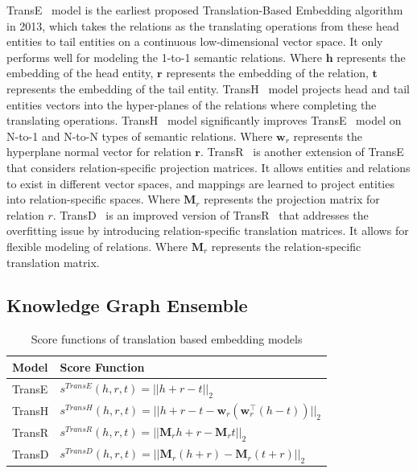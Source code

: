 \documentclass{article}
\begin{document}
TransE~\cite{bordes2013translating} model is the earliest proposed Translation-Based Embedding algorithm in 2013, which takes the relations as the translating operations from these head entities to tail entities on a continuous low-dimensional vector space. It only performs well for modeling the 1-to-1 semantic relations. Where \(\textbf{h}\) represents the embedding of the head entity, \(\textbf{r}\) represents the embedding of the relation, \(\textbf{t}\) represents the embedding of the tail entity. TransH~\cite{wang2014knowledge} model projects head and tail entities vectors into the hyper-planes of the relations where completing the translating operations. TransH~\cite{wang2014knowledge} model significantly improves TransE~\cite{bordes2013translating} model on N-to-1 and N-to-N types of semantic relations. Where \(\textbf{w}_r\) represents the hyperplane normal vector for relation \(\textbf{r}\). TransR~\cite{lin2015learning} is another extension of TransE~\cite{bordes2013translating} that considers relation-specific projection matrices. It allows entities and relations to exist in different vector spaces, and mappings are learned to project entities into relation-specific spaces. Where \(\textbf{M}_r\) represents the projection matrix for relation \(r\). TransD~\cite{ji2015knowledge} is an improved version of TransR~\cite{lin2015learning} that addresses the overfitting issue by introducing relation-specific translation matrices. It allows for flexible modeling of relations. Where \(\textbf{M}_r\) represents the relation-specific translation matrix.

\subsection{Knowledge Graph Ensemble}

\begin{table}[!tb]
    \centering
    \begin{tabular}{ll}
        \hline
        Model  & Score Function \\
        \hline
        TransE  & $s^{TransE}(h, r, t) = ||h + r - t||_2$\\
        TransH  & $s^{TransH}(h, r, t) = ||h + r - t - \textbf{w}_r(\textbf{w}_r^\top(h - t))||_2$\\
        TransR  & $s^{TransR}(h, r, t) = ||\textbf{M}_r h + r - \textbf{M}_r t||_2$\\
        TransD  & $s^{TransD}(h, r, t) = ||\textbf{M}_r (h + r) - \textbf{M}_r (t + r)||_2$\\
        \hline
    \end{tabular}
    \caption{Score functions of translation based embedding models}
    \label{tab:score}
    
\end{table}
\end{document}

